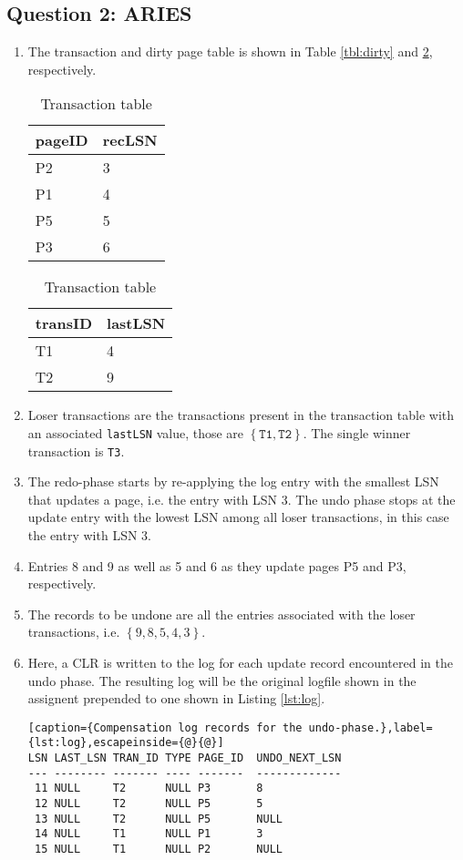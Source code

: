 \documentclass[11pt,a4paper,english]{article}
\begin{document}
\subsection*{Question 2: ARIES}
\begin{enumerate}
\item The transaction and dirty page table is shown in Table \ref{tbl:dirty} and \ref{tbl:transaction}, respectively.
\begin{table}[!hbt]
\parbox{.45\linewidth}{
\centering
\begin{tabular}{|l|l|}
\hline
pageID  & recLSN  \\ \hline
P2      & 3       \\ \hline
P1      & 4       \\ \hline
P5      & 5       \\ \hline
P3      & 6       \\ \hline
\end{tabular}
\caption{Dirty page table}
\label{tbl:dirty}
}
\hfill
\parbox{.45\linewidth}{
\centering
\begin{tabular}{|l|l|}
\hline
transID & lastLSN \\ \hline
T1      & 4       \\ \hline
T2      & 9       \\
\hline
\end{tabular}
\caption{Transaction table}
\label{tbl:transaction}
}
\end{table}

\item Loser transactions are the transactions present in the transaction table with an associated \texttt{lastLSN} value, those are $\left\{ \texttt{T1}, \texttt{T2} \right\}$. The single winner transaction is \texttt{T3}.

\item The redo-phase starts by re-applying the log entry with the smallest LSN that updates a page, i.e. the entry with LSN 3. The undo phase stops at the update entry with the lowest LSN among all loser transactions, in this case the entry with LSN 3.

\item Entries 8 and 9 as well as 5 and 6 as they update pages P5 and P3, respectively.

\item The records to be undone are all the entries associated with the loser transactions, i.e. $\left\{9, 8, 5, 4, 3\right\}$.

\item Here, a CLR is written to the log for each update record encountered in the undo phase. The resulting log will be the original logfile shown in the assignent prepended to one shown in Listing \ref{lst:log}.
\\
\begin{lstlisting}[caption={Compensation log records for the undo-phase.},label={lst:log},escapeinside={@}{@}]
LSN LAST_LSN TRAN_ID TYPE PAGE_ID  UNDO_NEXT_LSN
--- -------- ------- ---- -------  -------------
 11 NULL     T2      NULL P3       8
 12 NULL     T2      NULL P5       5
 13 NULL     T2      NULL P5       NULL
 14 NULL     T1      NULL P1       3
 15 NULL     T1      NULL P2       NULL
\end{lstlisting}


\end{enumerate}
\end{document}
